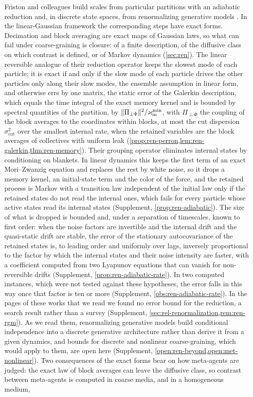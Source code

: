 Friston and colleagues build scales from particular partitions with an adiabatic reduction \citep{friston2019free} and, in discrete state spaces, from renormalizing generative models \citep{friston2025pixels}. In the linear-Gaussian framework the corresponding steps have exact forms. Decimation and block averaging are exact maps of Gaussian laws, so what can fail under coarse-graining is closure: of a finite description, of the diffusive class on which contrast is defined, or of Markov dynamics (\cref{sec:ren}). The linear reversible analogue of their reduction operator keeps the slowest mode of each particle; it is exact if and only if the slow mode of each particle drives the other particles only along their slow modes, the ensemble assumption in linear form, and otherwise errs by one matrix, the static error of the Galerkin description, which equals the time integral of the exact memory kernel and is bounded by spectral quantities of the partition, by $\Vert\Pi_{\perp\Phi}\Vert^2/\varkappa_{\mathrm{in}}^{\min}$, with $\Pi_{\perp\Phi}$ the coupling of the block averages to the coordinates within blocks, at most the cut dispersion $\sigma^2_{\mathrm{cut}}$ over the smallest internal rate, when the retained variables are the block averages of collectives with uniform leak (\cref{prop:ren-perron,lem:ren-galerkin,thm:ren-memory}). Their grouping operator eliminates internal states by conditioning on blankets. In linear dynamics this keeps the first term of an exact Mori--Zwanzig equation and replaces the rest by white noise, so it drops a memory kernel, an initial-state term and the color of the force, and the retained process is Markov with a transition law independent of the initial law only if the retained states do not read the internal ones, which fails for every particle whose active states read its internal states (Supplement, \cref{prop:ren-adiabatic}). The size of what is dropped is bounded and, under a separation of timescales, known to first order: when the noise factors are invertible and the internal drift and the quasi-static drift are stable, the error of the stationary autocovariance of the retained states is, to leading order and uniformly over lags, inversely proportional to the factor by which the internal states and their noise intensity are faster, with a coefficient computed from two Lyapunov equations that can vanish for non-reversible drifts (Supplement, \cref{prop:ren-adiabatic-rate}). In two computed instances, which were not tested against these hypotheses, the error falls in this way once that factor is ten or more (Supplement, \cref{obs:ren-adiabatic-rate}). In the pages of these works that we read we found no error bound for the reduction, a search result rather than a survey (Supplement, \cref{sec:rel-renormalization,rem:ren-rgm}). As we read them, renormalizing generative models build conditional independence into a discrete generative architecture rather than derive it from a given dynamics, and bounds for discrete and nonlinear coarse-graining, which would apply to them, are open here (Supplement, \cref{open:ren-beyond,open:met-nonlinear}). Two consequences of the exact forms bear on how meta-agents are judged: the exact law of block averages can leave the diffusive class, so contrast between meta-agents is computed in coarse media, and in a homogeneous medium, 